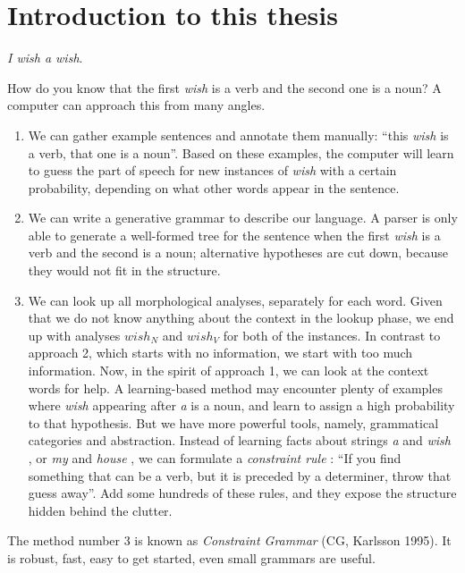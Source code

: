 \chapter{Introduction to this thesis}


\emph{I wish a wish}.


\noindent How do you know that the first \emph{wish} is a verb and the second one is a noun? A computer can approach this from many angles.

\begin{enumerate}
\item We can gather example sentences and annotate them manually: ``this \emph{wish} is a verb, that one is a noun''. Based on these examples, the computer will learn to guess the part of speech for new instances of \emph{wish} with a certain probability, depending on what other words appear in the sentence.

\item We can write a generative grammar to describe our language. 
A parser is only able to generate a well-formed tree for the sentence when the first \emph{wish} is a verb and the second is a noun; alternative hypotheses are cut down, because they would not fit in the structure.


\item We can look up all morphological analyses, separately for each word.
Given that we do not know anything about the context in the lookup phase, we end up with analyses $wish_N$ and $wish_V$ for both of the instances.
In contrast to approach 2, which starts with no information, we start with too much information.  
Now, in the spirit of approach 1, we can look at the context words for help. A learning-based method may encounter plenty of examples where \emph{wish} appearing after \emph{a} is a noun, and learn to assign a high probability to that hypothesis. 
But we have more powerful tools, namely, grammatical categories and abstraction.
Instead of learning facts about strings \emph{a} and \emph{wish} , or \emph{my} and \emph{house} , we can formulate a \emph{constraint rule} : ``If you find something that can be a verb, but it is preceded by a determiner, throw that guess away''. 
Add some hundreds of these rules, and they expose the structure hidden behind the clutter.
\end{enumerate}

The method number 3 is known as \emph{Constraint Grammar} (CG, Karlsson 1995).  
It is robust, fast, easy to get started, even small grammars are useful.  


